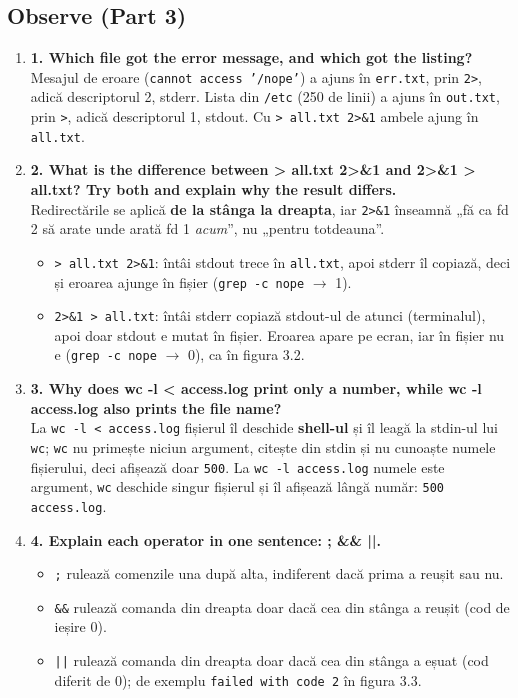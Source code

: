 \documentclass[12pt,a4paper]{article}
\newcommand{\Q}[2]{\item \textbf{#1}\\ #2}
\begin{document}
\subsection*{Observe (Part 3)}
\begin{enumerate}
\Q{1. Which file got the error message, and which got the listing?}
{Mesajul de eroare (\texttt{cannot access '/nope'}) a ajuns în \texttt{err.txt}, prin \texttt{2>}, adică descriptorul 2, stderr. Lista din \texttt{/etc} (250 de linii) a ajuns în \texttt{out.txt}, prin \texttt{>}, adică descriptorul 1, stdout. Cu \texttt{> all.txt 2>\&1} ambele ajung în \texttt{all.txt}.}
\Q{2. What is the difference between > all.txt 2>\&1 and 2>\&1 > all.txt? Try both and explain why the result differs.}
{Redirectările se aplică \textbf{de la stânga la dreapta}, iar \texttt{2>\&1} înseamnă „fă ca fd 2 să arate unde arată fd 1 \emph{acum}”, nu „pentru totdeauna”.
\begin{itemize}
  \item \texttt{> all.txt 2>\&1}: întâi stdout trece în \texttt{all.txt}, apoi stderr îl copiază, deci și eroarea ajunge în fișier (\texttt{grep -c nope} $\rightarrow$ 1).
  \item \texttt{2>\&1 > all.txt}: întâi stderr copiază stdout-ul de atunci (terminalul), apoi doar stdout e mutat în fișier. Eroarea apare pe ecran, iar în fișier nu e (\texttt{grep -c nope} $\rightarrow$ 0), ca în figura 3.2.
\end{itemize}}
\Q{3. Why does wc -l < access.log print only a number, while wc -l access.log also prints the file name?}
{La \texttt{wc -l < access.log} fișierul îl deschide \textbf{shell-ul} și îl leagă la stdin-ul lui \texttt{wc}; \texttt{wc} nu primește niciun argument, citește din stdin și nu cunoaște numele fișierului, deci afișează doar \texttt{500}. La \texttt{wc -l access.log} numele este argument, \texttt{wc} deschide singur fișierul și îl afișează lângă număr: \texttt{500 access.log}.}
\Q{4. Explain each operator in one sentence: ; \&\& ||.}
{\begin{itemize}
  \item \texttt{;} rulează comenzile una după alta, indiferent dacă prima a reușit sau nu.
  \item \texttt{\&\&} rulează comanda din dreapta doar dacă cea din stânga a reușit (cod de ieșire 0).
  \item \texttt{||} rulează comanda din dreapta doar dacă cea din stânga a eșuat (cod diferit de 0); de exemplu \texttt{failed with code 2} în figura 3.3.
\end{itemize}}
\end{enumerate}
\end{document}
